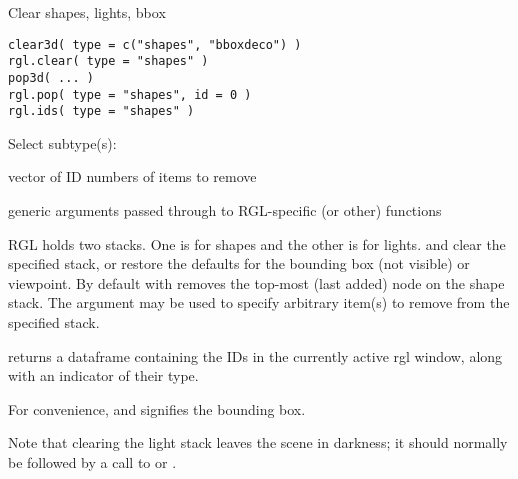 \documentclass{article}
\begin{document}
\begin{Description}\relax
Clear shapes, lights, bbox
\end{Description}
\begin{Usage}
\begin{verbatim}
clear3d( type = c("shapes", "bboxdeco") ) 
rgl.clear( type = "shapes" )
pop3d( ... )
rgl.pop( type = "shapes", id = 0 )  
rgl.ids( type = "shapes" )
\end{verbatim}
\end{Usage}
\begin{Arguments}
\begin{ldescription}
\item[\code{type}] Select subtype(s):

\item[\code{id}] vector of ID numbers of items to remove
\item[\code{...}] generic arguments passed through to RGL-specific (or other) functions
\end{ldescription}
\end{Arguments}
\begin{Details}\relax
RGL holds two stacks. One is for shapes and the other is for lights. 
 and  clear the specified stack, or restore
the defaults for the bounding box (not visible) or viewpoint.  By default
with   removes 
the top-most (last added) node on the shape stack.  The  argument
may be used to specify arbitrary item(s) to remove from the specified stack.

 returns a dataframe containing the IDs in the currently active
rgl window, along with an indicator of their type.

For convenience,  and 
 signifies the bounding box.

Note that clearing the light stack leaves the scene in darkness; it should normally
be followed by a call to  or .
\end{Details}
\end{document}
